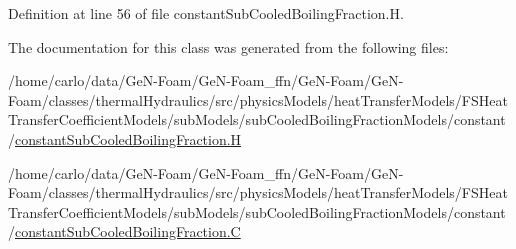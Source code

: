 Definition at line 56 of file constant\+Sub\+Cooled\+Boiling\+Fraction.\+H.



The documentation for this class was generated from the following files\+:\begin{DoxyCompactItemize}
\item 
/home/carlo/data/\+Ge\+N-\/\+Foam/\+Ge\+N-\/\+Foam\+\_\+ffn/\+Ge\+N-\/\+Foam/\+Ge\+N-\/\+Foam/classes/thermal\+Hydraulics/src/physics\+Models/heat\+Transfer\+Models/\+F\+S\+Heat\+Transfer\+Coefficient\+Models/sub\+Models/sub\+Cooled\+Boiling\+Fraction\+Models/constant/\hyperlink{constantSubCooledBoilingFraction_8H}{constant\+Sub\+Cooled\+Boiling\+Fraction.\+H}\item 
/home/carlo/data/\+Ge\+N-\/\+Foam/\+Ge\+N-\/\+Foam\+\_\+ffn/\+Ge\+N-\/\+Foam/\+Ge\+N-\/\+Foam/classes/thermal\+Hydraulics/src/physics\+Models/heat\+Transfer\+Models/\+F\+S\+Heat\+Transfer\+Coefficient\+Models/sub\+Models/sub\+Cooled\+Boiling\+Fraction\+Models/constant/\hyperlink{constantSubCooledBoilingFraction_8C}{constant\+Sub\+Cooled\+Boiling\+Fraction.\+C}\end{DoxyCompactItemize}
